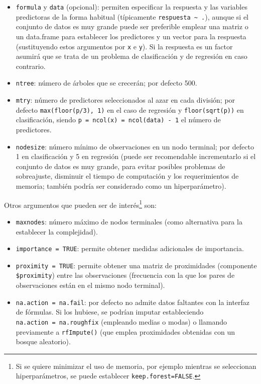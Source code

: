 \documentclass[
]{book}
\theoremstyle{break}
\theoremstyle{definition}
\theoremstyle{definition}
\theoremstyle{definition}
\theoremstyle{definition}
\theoremstyle{remark}
\begin{document}
\begin{itemize}
\item
  \texttt{formula} y \texttt{data} (opcional): permiten especificar la respuesta y las variables predictoras de la forma habitual (típicamente \texttt{respuesta\ \textasciitilde{}\ .}), aunque si el conjunto de datos es muy grande puede ser preferible emplear una matriz o un data.frame para establecer los predictores y un vector para la respuesta (sustituyendo estos argumentos por \texttt{x} e \texttt{y}).
  Si la respuesta es un factor asumirá que se trata de un problema de clasificación y de regresión en caso contrario.
\item
  \texttt{ntree}: número de árboles que se crecerán; por defecto 500.
\item
  \texttt{mtry}: número de predictores seleccionados al azar en cada división; por defecto \texttt{max(floor(p/3),\ 1)} en el caso de regresión y \texttt{floor(sqrt(p))} en clasificación, siendo \texttt{p\ =\ ncol(x)\ =\ ncol(data)\ -\ 1} el número de predictores.
\item
  \texttt{nodesize}: número mínimo de observaciones en un nodo terminal; por defecto 1 en clasificación y 5 en regresión (puede ser recomendable incrementarlo si el conjunto de datos es muy grande, para evitar posibles problemas de sobreajuste, disminuir el tiempo de computación y los requerimientos de memoria; también podría ser considerado como un hiperparámetro).
\end{itemize}

Otros argumentos que pueden ser de interés\footnote{Si se quiere minimizar el uso de memoria, por ejemplo mientras se seleccionan hiperparámetros, se puede establecer \texttt{keep.forest=FALSE}.} son:

\begin{itemize}
\item
  \texttt{maxnodes}: número máximo de nodos terminales (como alternativa para la establecer la complejidad).
\item
  \texttt{importance\ =\ TRUE}: permite obtener medidas adicionales de importancia.
\item
  \texttt{proximity\ =\ TRUE}: permite obtener una matriz de proximidades (componente \texttt{\$proximity}) entre las observaciones (frecuencia con la que los pares de observaciones están en el mismo nodo terminal).
\item
  \texttt{na.action\ =\ na.fail}: por defecto no admite datos faltantes con la interfaz de fórmulas. Si los hubiese, se podrían imputar estableciendo \texttt{na.action\ =\ na.roughfix} (empleando medias o modas) o llamando previamente a \texttt{rfImpute()} (que emplea proximidades obtenidas con un bosque aleatorio).
\end{itemize}
\end{document}
